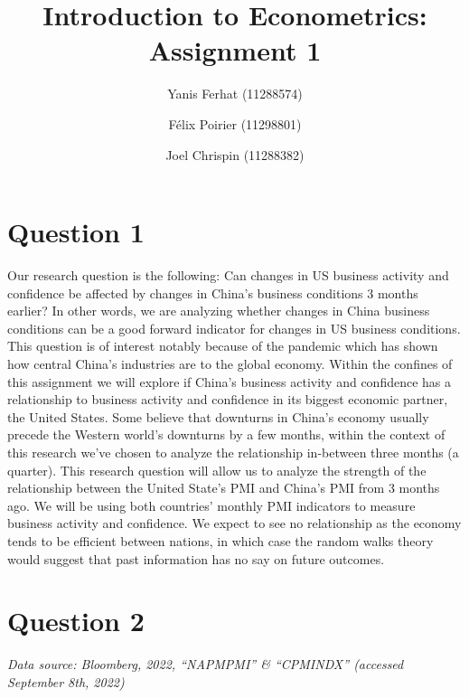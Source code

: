 \documentclass{article}
\title{Introduction to Econometrics: Assignment 1}
\author{Yanis Ferhat (11288574) \and Félix Poirier (11298801) \and Joel Chrispin (11288382)}
\date{\displaydate{date}}
\begin{document}
\maketitle

\section{Question 1}
Our research question is the following: Can changes in US business activity and confidence be affected by changes in China’s business conditions 3 months earlier? In other words, we are analyzing whether changes in China business conditions can be a good forward indicator for changes in US business conditions. This question is of interest notably because of the pandemic which has shown how central China's industries are to the global economy. Within the confines of this assignment we will explore if China's business activity and confidence has a relationship to business activity and confidence in its biggest economic partner, the United States. Some believe that downturns in China’s economy usually precede the Western world’s downturns by a few months, within the context of this research we've chosen to analyze the relationship in-between three months (a quarter). This research question will allow us to analyze the strength of the relationship between the United State's PMI and China's PMI from 3 months ago. We will be using both countries’ monthly PMI indicators to measure business activity and confidence. We expect to see no relationship as the economy tends to be efficient between nations, in which case the random walks theory would suggest that past information has no say on future outcomes.

\section{Question 2}
\textit{Data source: Bloomberg, 2022, “NAPMPMI” \& “CPMINDX” (accessed September 8th, 2022)}
\end{document}
